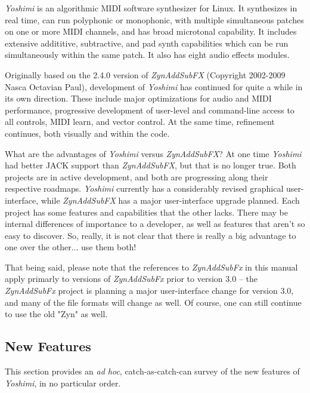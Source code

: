 \documentclass[
 11pt,
 twoside,
 a4paper,
 final                                 %
]{article}
\begin{document}
   \textsl{Yoshimi} is an algorithmic MIDI software synthesizer for Linux.
   It synthesizes in real time, can run polyphonic or monophonic, with multiple
   simultaneous patches on one or more MIDI channels, and has broad microtonal
   capability. It includes extensive addititive, subtractive,
   and pad synth capabilities which can be run simultaneously within the
   same patch.  It also has eight audio effects modules.

   Originally based on the 2.4.0 version of \textsl{ZynAddSubFX} (Copyright
   2002-2009 Nasca Octavian Paul), development of \textsl{Yoshimi} has
   continued for quite a while in its own direction. These include
   major optimizations for audio and MIDI performance,
   progressive development of user-level and command-line access to all
   controls, MIDI learn, and vector control.
   At the same time, refinement continues, both visually and within the code.

   What are the advantages of
   \textsl{Yoshimi} versus \textsl{ZynAddSubFX}?
   At one time \textsl{Yoshimi} had better JACK support
   than \textsl{ZynAddSubFX}, but that is no longer true.
   Both projects are in active development, and both are
   progressing along their respective roadmaps.
   \textsl{Yoshimi} currently has a considerably
   revised graphical user-interface,
   while \textsl{ZynAddSubFX} has a major user-interface upgrade planned.
   Each project has some features and capabilities that the other lacks.
   There may be internal differences of importance to
   a developer, as well as features that aren't so easy to discover.  So,
   really, it is not clear that there is really a big advantage to one over the
   other... use them both!

   That being said, please note that the references to \textsl{ZynAddSubFx}
   in this manual apply primarly to versions of \textsl{ZynAddSubFx}
   prior to version 3.0 -- the \textsl{ZynAddSubFx} project is planning
   a major user-interface change for version 3.0, and many of the file formats
   will change as well.  Of course, one can still continue to use the old
   "Zyn" as well.

\subsection{New Features}
\label{subsec:introduction_new_features}

   This section provides an \textsl{ad hoc}, catch-as-catch-can survey of the
   new features of \textsl{Yoshimi}, in no particular order.
\end{document}

